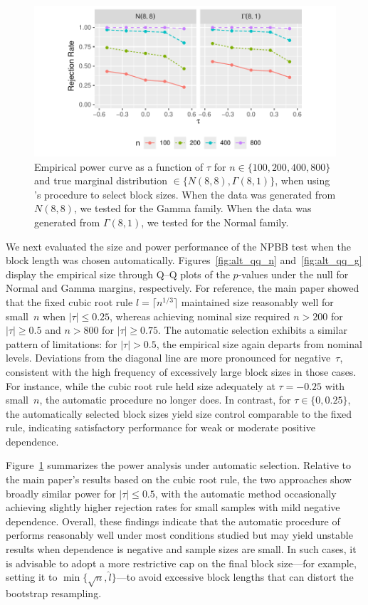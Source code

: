 \documentclass[12pt]{article}
\begin{document}
\begin{figure}[tbp]
  \centering
  \includegraphics[scale=1]{figures/alt_rr}
  \caption{Empirical power curve as a function of $\tau$ for
    $n \in \{100, 200, 400, 800\}$ and true marginal distribution
    $\in \{N(8,8), \Gamma(8,1)\}$, when using \citet{politis2004automatic}'s 
    procedure
    to select block sizes. When the data was generated from $N(8,8)$,
    we tested for the Gamma family. When the data was generated from
    $\Gamma(8,1)$, we tested for the Normal family.
  }
  \label{fig:alt_rr}
\end{figure}


We next evaluated the size and power performance of the NPBB test when
the block length was chosen automatically.
Figures~\ref{fig:alt_qq_n} and~\ref{fig:alt_qq_g} display the empirical
size through Q--Q plots of the $p$-values under the null for Normal and
Gamma margins, respectively. For reference, the main paper showed that
the fixed cubic root rule $l = \lceil n^{1/3} \rceil$ maintained size
reasonably well for small~$n$ when $|\tau| \le 0.25$, whereas achieving
nominal size required $n > 200$ for $|\tau| \ge 0.5$ and $n > 800$ for
$|\tau| \ge 0.75$. The automatic selection exhibits a similar pattern
of limitations: for $|\tau| > 0.5$, the empirical size again departs
from nominal levels. Deviations from the diagonal line are more
pronounced for negative~$\tau$, consistent with the high frequency of
excessively large block sizes in those cases. For instance, while the
cubic root rule held size adequately at $\tau = -0.25$ with small~$n$,
the automatic procedure no longer does. In contrast, for
$\tau \in \{0, 0.25\}$, the automatically selected block sizes yield
size control comparable to the fixed rule, indicating satisfactory
performance for weak or moderate positive dependence.


Figure~\ref{fig:alt_rr} summarizes the power analysis under automatic
selection. Relative to the main paper’s results based on the cubic root
rule, the two approaches show broadly similar power for
$|\tau| \le 0.5$, with the automatic method occasionally achieving
slightly higher rejection rates for small samples with mild negative
dependence. Overall, these findings indicate that the automatic
procedure of \citet{politis2004automatic} performs reasonably well under
most conditions studied but may yield unstable results when dependence
is negative and sample sizes are small. In such cases, it is advisable
to adopt a more restrictive cap on the final block size---for example,
setting it to $\min\{\sqrt{n}, \hat{l}\}$---to avoid excessive block
lengths that can distort the bootstrap resampling.




\end{document}
